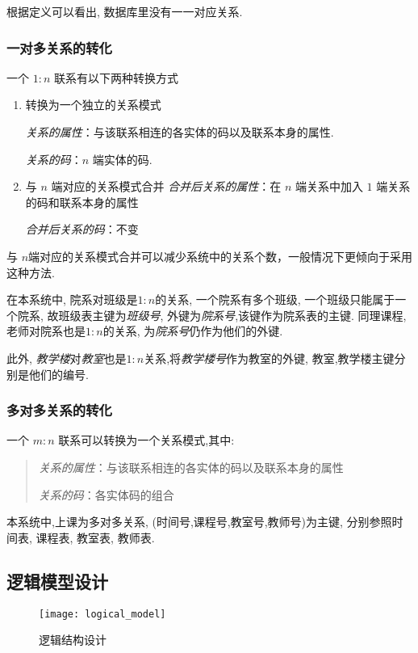 \documentclass{myreport}
\begin{document}
      根据定义可以看出, 数据库里没有一一对应关系.

    \subsubsection{一对多关系的转化}
      一个 $1:n$ 联系有以下两种转换方式
      \begin{enumerate}
        \item 转换为一个独立的关系模式

          \emph{关系的属性}：与该联系相连的各实体的码以及联系本身的属性.

          \emph{关系的码}：$n$ 端实体的码.
        \item 与 $n$ 端对应的关系模式合并
          \emph{合并后关系的属性}：在 $n$ 端关系中加入 $1$ 端关系的码和联系本身的属性

          \emph{合并后关系的码}：不变
      \end{enumerate}
      与 $n$端对应的关系模式合并可以减少系统中的关系个数，一般情况下更倾向于采用这种方法.

      在本系统中, 院系对班级是$1:n$的关系,
      一个院系有多个班级, 一个班级只能属于一个院系,
      故班级表主键为\emph{班级号}, 外键为\emph{院系号},该键作为院系表的主键.
      同理课程,老师对院系也是$1:n$的关系, 为\emph{院系号}仍作为他们的外键.

      此外, \emph{教学楼}对\emph{教室}也是$1:n$关系,将\emph{教学楼号}作为教室的外键,
      教室,教学楼主键分别是他们的编号.


    \subsubsection{多对多关系的转化}
      一个 $m:n$ 联系可以转换为一个关系模式,其中:
      \begin{quote}
        \emph{关系的属性}：与该联系相连的各实体的码以及联系本身的属性

        \emph{关系的码}：各实体码的组合
      \end{quote}

      本系统中,上课为多对多关系, (时间号,课程号,教室号,教师号)为主键,
      分别参照时间表, 课程表, 教室表, 教师表.
  \subsection{逻辑模型设计}
    \begin{figure}[H]
      \centering
      \texttt{[image: logical\_model]}
      \caption{逻辑结构设计}
      \label{fig:logical_model}
    \end{figure}
\end{document}
